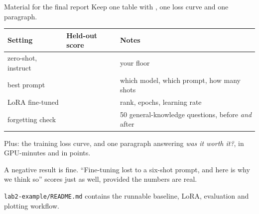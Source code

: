 \documentclass[aspectratio=169,10pt]{beamer}
\begin{document}
\begin{frame}[shrink=4]{Material for the final report}
  Keep one table with , one loss curve and one paragraph.
  \vspace{0.5em}
  \centering
  \begin{tabular}{@{}L{3.4cm} C{2.2cm} L{5.0cm}@{}}
    \toprule
    \textbf{Setting} & \textbf{Held-out score} & \textbf{Notes}\\
    \midrule
    zero-shot, instruct & & your floor\\
    best prompt & & which model, which prompt, how many shots\\
    LoRA fine-tuned & & rank, epochs, learning rate\\
    forgetting check & & 50 general-knowledge questions, before \emph{and} after\\
    \bottomrule
  \end{tabular}

  \vspace{0.8em}
  \raggedright
  \small
  Plus: the training loss curve, and one paragraph answering
  \emph{was it worth it?}, in GPU-minutes and in points.
  \vspace{0.3em}

  A negative result is fine. ``Fine-tuning lost to a six-shot prompt, and here
  is why we think so'' scores just as well, provided the numbers are real.
  \vspace{0.2em}

  \texttt{lab2-example/README.md} contains the runnable baseline, LoRA,
  evaluation and plotting workflow.
\end{frame}
\end{document}
